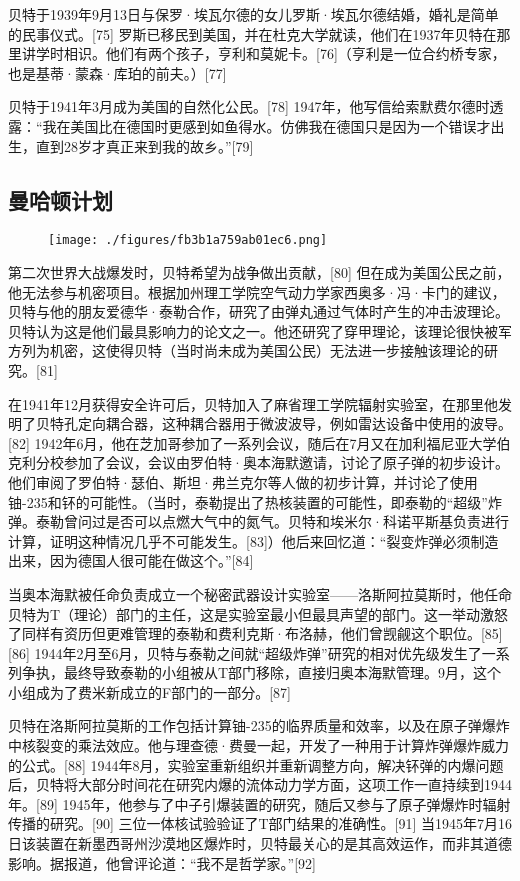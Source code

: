 贝特于1939年9月13日与保罗·埃瓦尔德的女儿罗斯·埃瓦尔德结婚，婚礼是简单的民事仪式。[75] 罗斯已移民到美国，并在杜克大学就读，他们在1937年贝特在那里讲学时相识。他们有两个孩子，亨利和莫妮卡。[76]（亨利是一位合约桥专家，也是基蒂·蒙森·库珀的前夫。）[77]

贝特于1941年3月成为美国的自然化公民。[78] 1947年，他写信给索默费尔德时透露：“我在美国比在德国时更感到如鱼得水。仿佛我在德国只是因为一个错误才出生，直到28岁才真正来到我的故乡。”[79]
\subsection{曼哈顿计划}\begin{figure}[ht]
\centering
\texttt{[image: ./figures/fb3b1a759ab01ec6.png]}
\caption{} \label{fig_Hans_4}
\end{figure}
第二次世界大战爆发时，贝特希望为战争做出贡献，[80] 但在成为美国公民之前，他无法参与机密项目。根据加州理工学院空气动力学家西奥多·冯·卡门的建议，贝特与他的朋友爱德华·泰勒合作，研究了由弹丸通过气体时产生的冲击波理论。贝特认为这是他们最具影响力的论文之一。他还研究了穿甲理论，该理论很快被军方列为机密，这使得贝特（当时尚未成为美国公民）无法进一步接触该理论的研究。[81]

在1941年12月获得安全许可后，贝特加入了麻省理工学院辐射实验室，在那里他发明了贝特孔定向耦合器，这种耦合器用于微波波导，例如雷达设备中使用的波导。[82] 1942年6月，他在芝加哥参加了一系列会议，随后在7月又在加利福尼亚大学伯克利分校参加了会议，会议由罗伯特·奥本海默邀请，讨论了原子弹的初步设计。他们审阅了罗伯特·瑟伯、斯坦·弗兰克尔等人做的初步计算，并讨论了使用铀-235和钚的可能性。（当时，泰勒提出了热核装置的可能性，即泰勒的“超级”炸弹。泰勒曾问过是否可以点燃大气中的氮气。贝特和埃米尔·科诺平斯基负责进行计算，证明这种情况几乎不可能发生。[83]）他后来回忆道：“裂变炸弹必须制造出来，因为德国人很可能在做这个。”[84]

当奥本海默被任命负责成立一个秘密武器设计实验室——洛斯阿拉莫斯时，他任命贝特为T（理论）部门的主任，这是实验室最小但最具声望的部门。这一举动激怒了同样有资历但更难管理的泰勒和费利克斯·布洛赫，他们曾觊觎这个职位。[85][86] 1944年2月至6月，贝特与泰勒之间就“超级炸弹”研究的相对优先级发生了一系列争执，最终导致泰勒的小组被从T部门移除，直接归奥本海默管理。9月，这个小组成为了费米新成立的F部门的一部分。[87]

贝特在洛斯阿拉莫斯的工作包括计算铀-235的临界质量和效率，以及在原子弹爆炸中核裂变的乘法效应。他与理查德·费曼一起，开发了一种用于计算炸弹爆炸威力的公式。[88] 1944年8月，实验室重新组织并重新调整方向，解决钚弹的内爆问题后，贝特将大部分时间花在研究内爆的流体动力学方面，这项工作一直持续到1944年。[89] 1945年，他参与了中子引爆装置的研究，随后又参与了原子弹爆炸时辐射传播的研究。[90] 三位一体核试验验证了T部门结果的准确性。[91] 当1945年7月16日该装置在新墨西哥州沙漠地区爆炸时，贝特最关心的是其高效运作，而非其道德影响。据报道，他曾评论道：“我不是哲学家。”[92]
